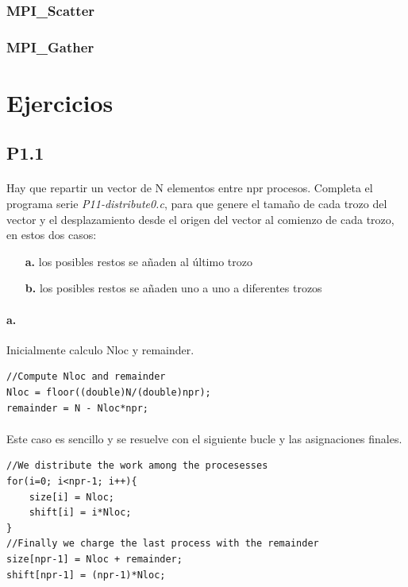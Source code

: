 \documentclass[es,gi]{ifirak}
\begin{document}
\begin{multicols}{2}
\subsubsection{MPI\_Scatter}


\subsubsection{MPI\_Gather}



\pagebreak
\section{Ejercicios}

\subsection{P1.1}
\paragraph{}
Hay que repartir un vector de N elementos entre npr procesos. Completa el programa serie \textit{P11-distribute0.c}, para que genere el tamaño de cada trozo del vector y el desplazamiento desde el origen del vector al comienzo de cada trozo, en estos dos casos: 

\begin{itemize}
\item[\textbf{a.}] los posibles restos se añaden al último trozo
\item[\textbf{b.}] los posibles restos se añaden uno a uno a diferentes trozos
\end{itemize}

\hline

\paragraph{a.}
Inicialmente calculo Nloc y remainder.
\begin{lstlisting}
//Compute Nloc and remainder
Nloc = floor((double)N/(double)npr);
remainder = N - Nloc*npr;
\end{lstlisting}
\paragraph{}
Este caso es sencillo y se resuelve con el siguiente bucle y las asignaciones finales.
\begin{lstlisting}
//We distribute the work among the procesesses
for(i=0; i<npr-1; i++){
	size[i] = Nloc;
	shift[i] = i*Nloc;
}
//Finally we charge the last process with the remainder
size[npr-1] = Nloc + remainder;
shift[npr-1] = (npr-1)*Nloc;
\end{lstlisting}


\end{multicols}
\end{document}

